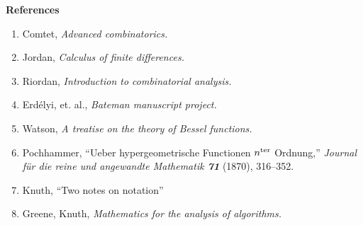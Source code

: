 \documentclass{article}
\begin{document}
{\bf References}
\begin{enumerate}
\item Comtet,  {\em Advanced combinatorics.}
\item Jordan, {\em Calculus of finite differences.}
\item Riordan, {\em Introduction to combinatorial analysis.}
\item Erd\'elyi, et. al., {\em Bateman manuscript project.}
\item Watson, {\em A treatise on the theory of Bessel functions.}\ 
\item Pochhammer, ``Ueber hypergeometrische Functionen $n^{\rm ter}$
  Ordnung,'' {\sl Journal f\"ur die reine und angewandte Mathematik\/
    \bf 71} (1870), 316--352.
\item Knuth, ``Two notes on notation'' 
\item Greene, Knuth, {\em Mathematics for the analysis of algorithms.}
\end{enumerate}
\end{document}
